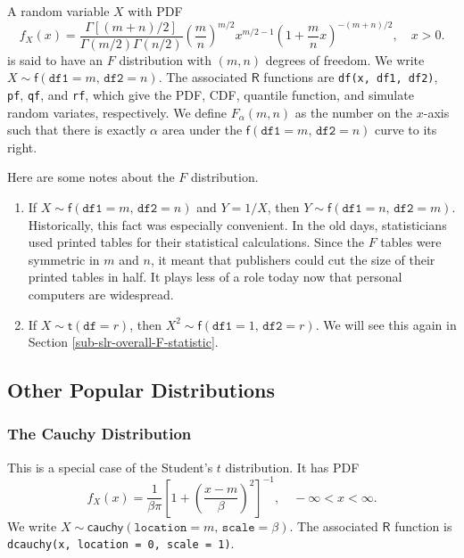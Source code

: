 \documentclass[captions=tableheading]{scrbook}
\begin{document}
A random variable \(X\) with PDF
\begin{equation}
f_{X}(x)=\frac{\Gamma[(m+n)/2]}{\Gamma(m/2)\Gamma(n/2)}\left(\frac{m}{n}\right)^{m/2}x^{m/2-1}\left(1+\frac{m}{n}x\right)^{-(m+n)/2},\quad x>0.
\end{equation}
is said to have an \(F\) distribution with \((m,n)\) degrees of freedom. We write \(X\sim\mathsf{f}(\mathtt{df1}=m,\,\mathtt{df2}=n)\). The associated \(\mathsf{R}\) functions are \texttt{df(x, df1, df2)}, \texttt{pf}, \texttt{qf}, and \texttt{rf}, which give the PDF, CDF, quantile function, and simulate random variates, respectively. We define \(F_{\alpha}(m,n)\) as the number on the \(x\)-axis such that there is exactly \(\alpha\) area under the \(\mathsf{f}(\mathtt{df1}=m,\,\mathtt{df2}=n)\) curve to its right. 

\begin{rem}
Here are some notes about the \(F\) distribution.
\begin{enumerate}
\item If \(X\sim\mathsf{f}(\mathtt{df1}=m,\,\mathtt{df2}=n)\) and \(Y=1/X\), then \(Y\sim\mathsf{f}(\mathtt{df1}=n,\,\mathtt{df2}=m)\). Historically, this fact was especially convenient. In the old days, statisticians used printed tables for their statistical calculations. Since the \(F\) tables were symmetric in \(m\) and \(n\), it meant that publishers could cut the size of their printed tables in half. It plays less of a role today now that personal computers are widespread.
\item If \(X\sim\mathsf{t}(\mathtt{df}=r)\), then \(X^{2}\sim\mathsf{f}(\mathtt{df1}=1,\,\mathtt{df2}=r)\). We will see this again in Section \ref{sub-slr-overall-F-statistic}.
\end{enumerate}

\end{rem}
\subsection{Other Popular Distributions}
\label{sec-1-5-3}
\label{sub-Other-Popular-Distributions}
\subsubsection{The Cauchy Distribution}
\label{sec-1-5-3-1}
\label{sub-The-Cauchy-Distribution}


This is a special case of the Student's \(t\) distribution. It has PDF
\begin{equation}
f_{X}(x) = \frac{1}{\beta\pi} \left[ 1+\left( \frac{x-m}{\beta} \right)^{2} \right]^{-1},\quad -\infty < x < \infty.
\end{equation}
We write \(X\sim\mathsf{cauchy}(\mathtt{location}=m,\,\mathtt{scale}=\beta)\). The associated \(\mathsf{R}\) function is \texttt{dcauchy(x, location = 0, scale = 1)}.
\end{document}
